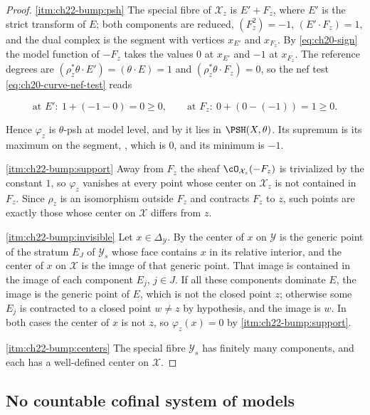 \begin{proof}
\cref{itm:ch22-bump:psh}  The special fibre of \(\mathcal X_z\) is
\(E'+F_z\), where \(E'\) is the strict transform of \(E\); both components
are reduced, \((F_z^2)=-1\), \((E'\cdot F_z)=1\), and the dual complex is
the segment with vertices \(x_{E'}\) and \(x_{F_z}\).  By
\eqref{eq:ch20-sign} the model function of \(-F_z\) takes the values
\(0\) at \(x_{E'}\) and \(-1\) at \(x_{F_z}\).  The reference degrees are
\((\rho_z^*\theta\cdot E')=(\theta\cdot E)=1\) and
\((\rho_z^*\theta\cdot F_z)=0\), so the nef test
\eqref{eq:ch20-curve-nef-test} reads

\[
 \text{at }E':\ 1+(-1-0)=0\geq0,
 \qquad
 \text{at }F_z:\ 0+(0-(-1))=1\geq0 .
\]

Hence \(\varphi_z\) is \(\theta\)-psh at model level, and by
 it lies in \(\PSH(X,\theta)\).  Its
supremum is its maximum on the segment,
, which is \(0\), and its minimum is
\(-1\).

\cref{itm:ch22-bump:support}  Away from \(F_z\) the sheaf
\(\cO_{\mathcal X_z}(-F_z)\) is trivialized by the constant \(1\), so
\(\varphi_z\) vanishes at every point whose center on \(\mathcal X_z\) is
not contained in \(F_z\).  Since \(\rho_z\) is an isomorphism outside
\(F_z\) and contracts \(F_z\) to \(z\), such points are exactly those whose
center on \(\mathcal X\) differs from \(z\).

\cref{itm:ch22-bump:invisible}  Let \(x\in\Delta_{\mathcal Y}\).  By
 the center of \(x\) on
\(\mathcal Y\) is the generic point of the stratum \(E_J\) of
\(\mathcal Y_s\) whose face contains \(x\) in its relative interior, and the
center of \(x\) on \(\mathcal X\) is the image of that generic point.  That
image is contained in the image of each component \(E_j\), \(j\in J\).  If
all these components dominate \(E\), the image is the generic point of
\(E\), which is not the closed point \(z\); otherwise some \(E_j\) is
contracted to a closed point \(w\neq z\) by hypothesis, and the image is
\(w\).  In both cases the center of \(x\) is not \(z\), so
\(\varphi_z(x)=0\) by \cref{itm:ch22-bump:support}.

\cref{itm:ch22-bump:centers}  The special fibre \(\mathcal Y_s\) has finitely
many components, and each has a well-defined center on \(\mathcal X\).
\end{proof}

\subsection{No countable cofinal system of models}

